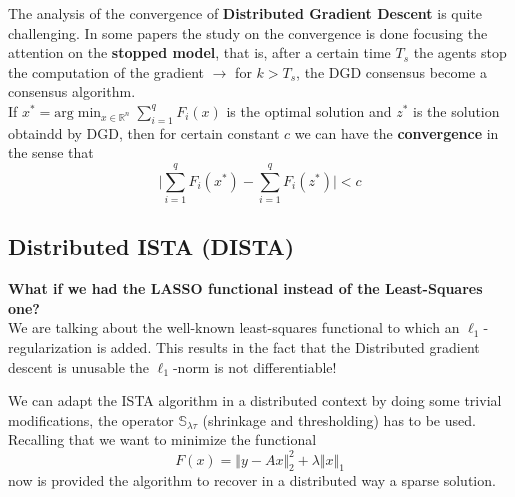 The analysis of the convergence of \textbf{Distributed Gradient Descent} is quite challenging. In some papers the study on the convergence is done focusing the attention on the \textbf{stopped model}, that is, after a certain time $T_s$ the agents stop the computation of the gradient $\longrightarrow$ for $k>T_s$, the DGD consensus become a consensus algorithm. \\
If $x^*= \text{arg}\min_{x\in\mathbb{R}^n} \sum_{i=1}^q F_i(x)$ is the optimal solution and $z^*$ is the solution obtaindd by DGD, then for certain constant $c$ we can have the \textbf{convergence} in the sense that
\begin{equation*}
    \bigg\vert \sum_{i=1}^q F_i(x^*) - \sum_{i=1}^q F_i(z^*)\bigg\vert < c
\end{equation*}

\subsection{Distributed ISTA (DISTA)}
{\color{cyan}
\textbf{What if we had the LASSO functional instead of the Least-Squares one?}
}
\\
We are talking about the well-known least-squares functional to which an $\ell_1$-regularization is added. This results in the fact that the Distributed gradient descent is unusable the $\ell_1$-norm is not differentiable! 

We can adapt the ISTA algorithm in a distributed context by doing some trivial modifications, the operator $\mathbb{S}_{\lambda\tau}$ (shrinkage and thresholding) has to be used. Recalling that we want to minimize the functional 
\begin{equation*}
    F(x)=\Vert y-Ax \Vert_2^2 + \lambda \Vert x \Vert_1
\end{equation*}
now is provided the algorithm to recover in a distributed way a sparse solution. 


